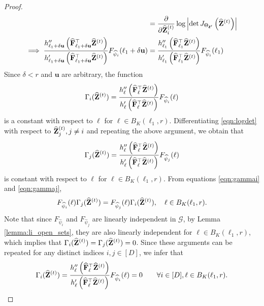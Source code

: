 \begin{proof}
\begin{align}
     &= \frac{\partial}{\partial \widehat{\mathbf{Z}}^{(t)}_i} \log \left| \det J_{\Theta_{\mathbf{\boldsymbol \ell}'}}\left(\widehat{\mathbf{Z}}^{(t)}\right) \right| \nonumber \\
    \implies \frac{h''_{\ell_1+\delta \mathbf{u}}\left( \widehat{\mathbf{F}}_{\ell_1+\delta \mathbf{u}}^\top \widehat{\mathbf{Z}}^{(t)} \right)}{h'_{\ell_1+\delta \mathbf{u}}\left( \widehat{\mathbf{F}}_{\ell_1+\delta \mathbf{u}}^\top \widehat{\mathbf{Z}}^{(t)} \right)} F_{\widehat{\psi}_i}(\ell_1+\delta \mathbf{u}) &= \frac{h''_{\ell_1}\left( \widehat{\mathbf{F}}_{\ell_1}^\top \widehat{\mathbf{Z}}^{(t)} \right)}{h'_{\ell_1}\left( \widehat{\mathbf{F}}_{\ell_1}^\top \widehat{\mathbf{Z}}^{(t)} \right)} F_{\widehat{\psi}_i}(\ell_1) 
  \end{align}
  Since $\delta < r$ and $\mathbf{u}$ are arbitrary, the function 
  \begin{align}
      \Gamma_i(\widehat{\mathbf{Z}}^{(t)}) = \frac{h''_{\ell}\left( \widehat{\mathbf{F}}_{\ell}^\top \widehat{\mathbf{Z}}^{(t)} \right)}{h'_{\ell}\left( \widehat{\mathbf{F}}_{\ell}^\top \widehat{\mathbf{Z}}^{(t)} \right)} F_{\widehat{\psi}_i}(\ell) \label{eqn:gammai}
  \end{align}
  is a constant with respect to $\ell$ for $\ell \in B_{K}(\ell_1, r)$. Differentiating \eqref{eqn:logdet} with respect to $\widehat{\mathbf{Z}}^{(t)}_j, j \neq i$ and repeating the above argument, we obtain that
    \begin{align}
      \Gamma_j(\widehat{\mathbf{Z}}^{(t)}) = \frac{h''_{\ell}\left( \widehat{\mathbf{F}}_{\ell}^\top \widehat{\mathbf{Z}}^{(t)} \right)}{h'_{\ell}\left( \widehat{\mathbf{F}}_{\ell}^\top \widehat{\mathbf{Z}}^{(t)} \right)} F_{\widehat{\psi}_j}(\ell) \label{eqn:gammaj}
  \end{align}
  is constant with respect to $\ell$ for $\ell \in B_K(\ell_1, r)$. From equations \ref{eqn:gammai} and \ref{eqn:gammaj},
    \begin{align}
      F_{\widehat{\psi}_i}(\ell)\Gamma_j(\widehat{\mathbf{Z}}^{(t)}) = F_{\widehat{\psi}_j}(\ell) \Gamma_i(\widehat{\mathbf{Z}}^{(t)}), \quad \ell \in B_K(\ell_1, r). 
  \end{align}
  Note that since $F_{\widehat{\psi}_i}$ and $F_{\widehat{\psi}_j}$ are linearly independent in $\mathcal{G}$, by Lemma \ref{lemma:li_open_sets}, they are also linearly independent for $\ell \in B_K(\ell_1, r)$, which implies that $\displaystyle \Gamma_i(\widehat{\mathbf{Z}}^{(t)}) = \Gamma_j(\widehat{\mathbf{Z}}^{(t)}) = 0$. Since these arguments can be repeated for any distinct indices $i, j \in [D]$, we infer that
  \begin{align}
  \Gamma_i(\widehat{\mathbf{Z}}^{(t)}) = \frac{h''_{\ell}\left( \widehat{\mathbf{F}}_{\ell}^\top \widehat{\mathbf{Z}}^{(t)} \right)}{h'_{\ell}\left( \widehat{\mathbf{F}}_{\ell}^\top \widehat{\mathbf{Z}}^{(t)} \right)} F_{\widehat{\psi}_i}(\ell) = 0 \qquad \forall i \in [D],  \ell \in B_K(\ell_1, r). \label{eqn:gamma_zero}    
  \end{align}
  

\end{proof}
